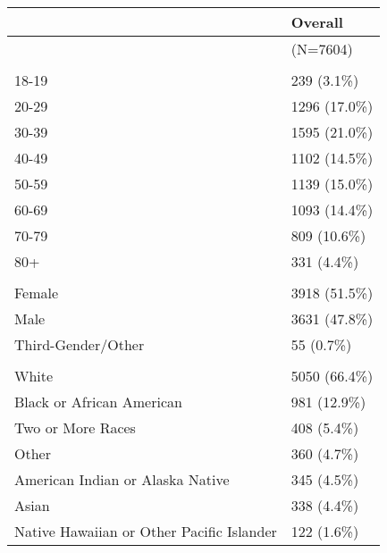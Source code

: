 \documentclass[
  letterpaper,
  DIV=11,
  numbers=noendperiod]{scrartcl}
\begin{document}
\begin{table}
{\begin{tabular}[t]{ll}
\toprule
  & Overall\\
\midrule
 & (N=7604)\\
\addlinespace[0.3em]
\multicolumn{2}{l}{\textbf{Age}}\\
\hspace{1em}18-19 & 239 (3.1\%)\\
\hspace{1em}20-29 & 1296 (17.0\%)\\
\hspace{1em}30-39 & 1595 (21.0\%)\\
\hspace{1em}40-49 & 1102 (14.5\%)\\
\hspace{1em}50-59 & 1139 (15.0\%)\\
\hspace{1em}60-69 & 1093 (14.4\%)\\
\hspace{1em}70-79 & 809 (10.6\%)\\
\hspace{1em}80+ & 331 (4.4\%)\\
\addlinespace[0.3em]
\multicolumn{2}{l}{\textbf{Sex}}\\
\hspace{1em}Female & 3918 (51.5\%)\\
\hspace{1em}Male & 3631 (47.8\%)\\
\hspace{1em}Third-Gender/Other & 55 (0.7\%)\\
\addlinespace[0.3em]
\multicolumn{2}{l}{\textbf{Race}}\\
\hspace{1em}White & 5050 (66.4\%)\\
\hspace{1em}Black or African American & 981 (12.9\%)\\
\hspace{1em}Two or More Races & 408 (5.4\%)\\
\hspace{1em}Other & 360 (4.7\%)\\
\hspace{1em}American Indian or Alaska Native & 345 (4.5\%)\\
\hspace{1em}Asian & 338 (4.4\%)\\
\hspace{1em}Native Hawaiian or Other Pacific Islander & 122 (1.6\%)\\

\end{tabular}}
\end{table}
\end{document}
